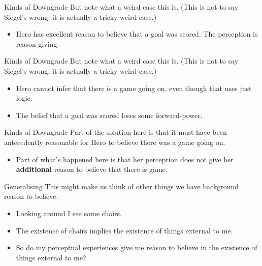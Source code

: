 \documentclass[
  17pt,
  letterpaper,
  ignorenonframetext,
  aspectratio=169,
  handout,
  xcolor={dvipsnames}]{beamer}
\providecommand{\tightlist}{%
  \setlength{\itemsep}{0pt}\setlength{\parskip}{0pt}}\usepackage{longtable,booktabs,array}
\begin{document}
\begin{frame}{Kinds of Downgrade}
\protect\hypertarget{kinds-of-downgrade}{}
But note what a weird case this is. (This is not to say Siegel's wrong;
it is actually a tricky weird case.)

\begin{itemize}[<+->]
\tightlist
\item
  Hero has excellent reason to believe that a goal was scored. The
  perception is reason-giving.
\end{itemize}
\end{frame}

\begin{frame}{Kinds of Downgrade}
\protect\hypertarget{kinds-of-downgrade-1}{}
But note what a weird case this is. (This is not to say Siegel's wrong;
it is actually a tricky weird case.)

\begin{itemize}[<+->]
\tightlist
\item
  Hero cannot infer that there is a game going on, even though that uses
  just logic.
\item
  The belief that a goal was scored loses some forward-power.
\end{itemize}
\end{frame}

\begin{frame}{Kinds of Downgrade}
\protect\hypertarget{kinds-of-downgrade-2}{}
Part of the solution here is that it must have been antecedently
reasonable for Hero to believe there was a game going on.

\begin{itemize}[<+->]
\tightlist
\item
  Part of what's happened here is that her perception does not give her
  \textbf{additional} reason to believe that there is game.
\end{itemize}
\end{frame}

\begin{frame}{Generalising}
\protect\hypertarget{generalising}{}
This might make us think of other things we have background reason to
believe.

\begin{itemize}[<+->]
\tightlist
\item
  Looking around I see some chairs.
\item
  The existence of chairs implies the existence of things external to
  me.
\item
  So do my perceptual experiences give me reason to believe in the
  existence of things external to me?
\end{itemize}
\end{frame}
\end{document}
